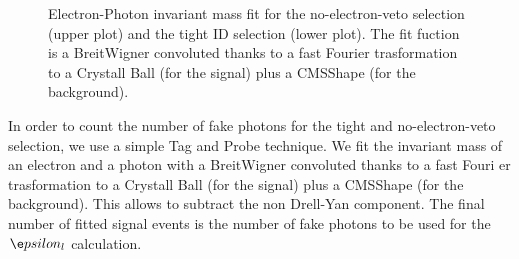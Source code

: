 \begin{figure}[!ht]
  \begin{center}
  \end{center}
    \caption{Electron-Photon invariant mass fit for the no-electron-veto selection (upper plot) and the tight ID selection (lower plot). The fit fuction is a BreitWigner convoluted thanks to a fast Fourier trasformation to a 
Crystall Ball
 (for the signal) plus a CMSShape (for the background).}
    \label{Zmass_lepton}
\end{figure}

In order to count the number of fake photons for the tight and no-electron-veto selection, we use a simple Tag and Probe technique. We fit the invariant mass of an electron and a photon with a BreitWigner convoluted thanks to a 
fast Fouri
er trasformation to a Crystall Ball (for the signal) plus a CMSShape (for the background). This allows to subtract the non Drell-Yan component. The final number of fitted signal events is the number of fake photons to be used for 
the  $\e
psilon_{l}$ calculation.\\

